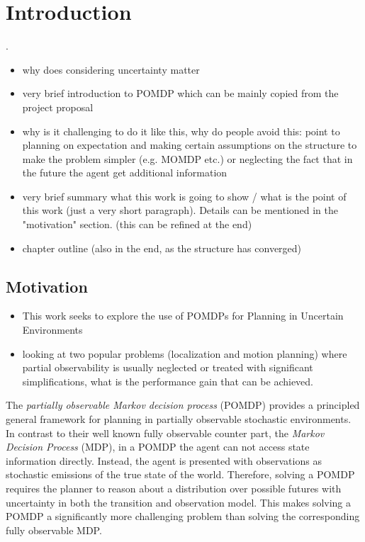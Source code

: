 \chapter{Introduction}

.
\begin{itemize}
  \item why does considering uncertainty matter
  \item very brief introduction to POMDP which can be mainly copied from the project proposal
  \item why is it challenging to do it like this, why do people avoid this:
        point to planning on expectation and making certain assumptions on the structure to
        make the problem simpler (e.g. MOMDP etc.) or neglecting the fact that
        in the future the agent get additional information
  \item very brief summary what this work is going to show / what is the point
        of this work (just a very short paragraph). Details can be mentioned in the
        "motivation" section. (this can be refined at the end)
  \item chapter outline (also in the end, as the structure has converged)
\end{itemize}

\section{Motivation}


\begin{itemize}
  \item This work seeks to explore the use of POMDPs for Planning in Uncertain Environments
  \item looking at two popular problems (localization and motion planning)
  where partial observability is usually neglected or treated with significant
  simplifications, what is the performance gain that can be achieved.
\end{itemize}

The \textit{partially observable Markov decision process} (POMDP) provides
a principled general framework for planning in partially observable stochastic
environments. In contrast to their well known fully observable counter part,
the \textit{Markov Decision Process} (MDP), in a POMDP the agent can not access
state information directly. Instead, the agent is presented with observations
as stochastic emissions of the true state of the world. Therefore, solving
a POMDP requires the planner to reason about a distribution over possible
futures with uncertainty in both the transition and observation model. This
makes solving a POMDP a significantly more challenging problem than solving the
corresponding fully observable MDP.\\

